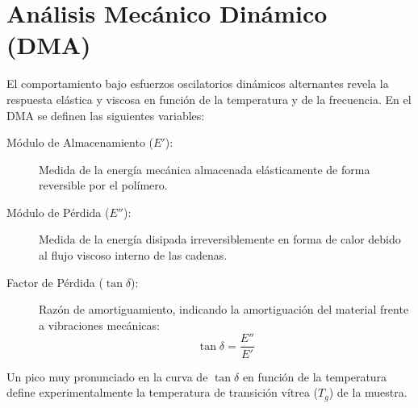 \section{Análisis Mecánico Dinámico (DMA)}

El comportamiento bajo esfuerzos oscilatorios dinámicos alternantes revela la respuesta elástica y viscosa en función de la temperatura y de la frecuencia. En el DMA se definen las siguientes variables:
\begin{description}
    \item[Módulo de Almacenamiento ($E'$):] Medida de la energía mecánica almacenada elásticamente de forma reversible por el polímero.
    \item[Módulo de Pérdida ($E''$):] Medida de la energía disipada irreversiblemente en forma de calor debido al flujo viscoso interno de las cadenas.
    \item[Factor de Pérdida ($\tan \delta$):] Razón de amortiguamiento, indicando la amortiguación del material frente a vibraciones mecánicas:
        \begin{equation}
            \tan \delta = \frac{E''}{E'}
            \label{eq:tan_delta}
        \end{equation}
\end{description}
Un pico muy pronunciado en la curva de $\tan \delta$ en función de la temperatura define experimentalmente la temperatura de transición vítrea ($T_g$) de la muestra.
